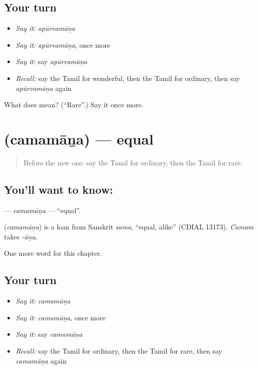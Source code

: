\subsection*{Your turn}
\begin{itemize}
\raggedright
  \item \emph{Say it:} \emph{apūrvamāṉa}
  \item \emph{Say it:} \emph{apūrvamāṉa}, once more
  \item \emph{Say it:} say \emph{apūrvamāṉa}
  \item \emph{Recall:} say the Tamil for wonderful, then the Tamil for ordinary, then say \emph{apūrvamāṉa} again
\end{itemize}

\begin{tcolorbox}[breakable,colback=teal!4,colframe=teal!35!black,title={Before you move on}]
What does  mean? (\textquotedblleft{}Rare\textquotedblright{}.) Say it once more.
\end{tcolorbox}
\section[\texorpdfstring{\ta{சமமான} (camamāṉa)}{சமமான (camamāṉa)}]{ (camamāṉa) — equal}

\label{lesson:TA-C241-camamana}



\begin{quote}
Before the new one: say the Tamil for ordinary, then the Tamil for rare.
\end{quote}

\subsection*{You'll want to know: }
\textbf{} — \emph{camamāṉa} — \textquotedblleft{}equal\textquotedblright{}.

\begin{cousinweb}
\textbf{} (\emph{camamāṉa}) is a loan from Sanskrit \emph{sama}, \textquotedblleft{}equal, alike\textquotedblright{} (CDIAL 13173). \emph{Camam} takes \emph{-āṉa}.
\end{cousinweb}

\begin{grammarlens}[title={What you've built}]
One more word for this chapter.
\end{grammarlens}

\subsection*{Your turn}
\begin{itemize}
\raggedright
  \item \emph{Say it:} \emph{camamāṉa}
  \item \emph{Say it:} \emph{camamāṉa}, once more
  \item \emph{Say it:} say \emph{camamāṉa}
  \item \emph{Recall:} say the Tamil for ordinary, then the Tamil for rare, then say \emph{camamāṉa} again
\end{itemize}

